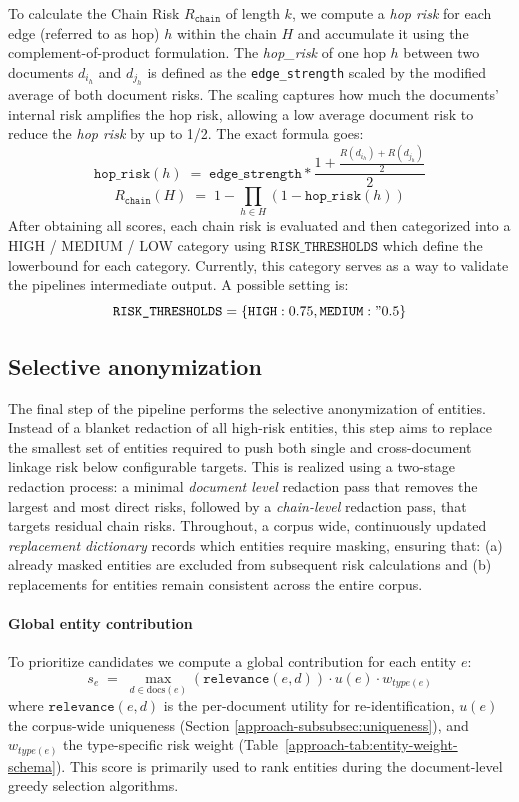 To calculate the Chain Risk $R_{\texttt{chain}}$ of length $k$, we compute a \emph{hop risk} for each edge (referred to as hop) $h$ within the chain $H$ and accumulate it using the complement-of-product formulation. The \textit{hop\_risk} of one hop $h$ between two documents $d_{i_h}$ and $d_{j_h}$ is defined as the \texttt{edge\_strength} scaled by the modified average of both document risks. The scaling captures how much the documents' internal risk amplifies the hop risk, allowing a low average document risk to reduce the \emph{hop risk} by up to 1/2. The exact formula goes:
\[
\texttt{hop\_risk}(h)\;=\; \texttt{edge\_strength} * \frac{1+\frac{R(d_{i_h}) + R(d_{j_h})}{2}}{2}
\]
\[
R_{\texttt{chain}}(H) \;=\; 1 - \prod_{h\in H} (1 - \texttt{hop\_risk}(h))
\]
After obtaining all scores, each chain risk is evaluated and then categorized into a HIGH / MEDIUM / LOW category using $\texttt{RISK\_THRESHOLDS}$ which define the lowerbound for each category. Currently, this category serves as a way to validate the pipelines intermediate output. A possible setting is:
\[
\texttt{RISK\_THRESHOLDS} = \{\texttt{HIGH}: 0.75, \texttt{MEDIUM}:" 0.5\}
\]

\subsection{Selective anonymization}
The final step of the pipeline performs the selective anonymization of entities. Instead of a blanket redaction of all high-risk entities, this step aims to replace the smallest set of entities required to push both single and cross-document linkage risk below configurable targets. This is realized using a two-stage redaction process: a minimal \textit{document level} redaction pass that removes the largest and most direct risks, followed by a \textit{chain-level} redaction pass, that targets residual chain risks. Throughout, a corpus wide, continuously updated \textit{replacement dictionary} records which entities require masking, ensuring that: (a) already masked entities are excluded from subsequent risk calculations and (b) replacements for entities remain consistent across the entire corpus.


\paragraph{Global entity contribution} 
To prioritize candidates we compute a global contribution for each entity \(e\):
\[
s_e \;=\; \max_{d\in\mathrm{docs}(e)} (\texttt{relevance}(e,d)) \cdot u(e) \cdot w_{type(e)}
\]
where $\texttt{relevance}(e,d)$ is the per-document utility for re-identification, $u(e)$ the corpus-wide uniqueness (Section \ref{approach-subsubsec:uniqueness}), and $w_{type(e)}$ the type-specific risk weight (Table~\ref{approach-tab:entity-weight-schema}). This score is primarily used to rank entities during the document-level greedy selection algorithms.

